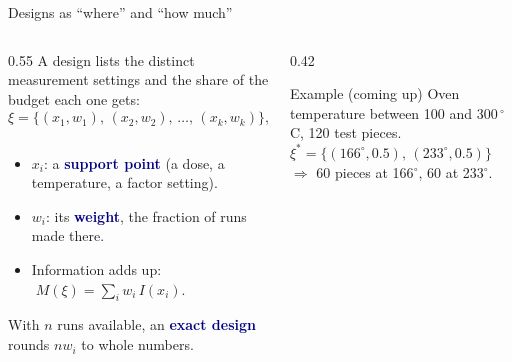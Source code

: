 \documentclass[aspectratio=169,10pt]{beamer}
\newcommand{\key}[1]{\textcolor{navy}{\textbf{#1}}}
\begin{document}
\begin{frame}{Designs as ``where'' and ``how much''}
  \begin{columns}[T]
    \begin{column}{0.55\textwidth}
      A design lists the distinct measurement settings and the share of the budget each one gets:
      \[
        \xi = \{(x_1,w_1),\,(x_2,w_2),\,\ldots,\,(x_k,w_k)\},\qquad \sum_i w_i = 1 .
      \]
      \begin{itemize}
        \item $x_i$: a \key{support point} (a dose, a temperature, a factor setting).
        \item $w_i$: its \key{weight}, the fraction of runs made there.
        \item Information adds up: $\;M(\xi)=\sum_i w_i\, I(x_i)$.
      \end{itemize}
      \vspace{0.4em}
      With $n$ runs available, an \key{exact design} rounds $n w_i$ to whole numbers.
    \end{column}
    \begin{column}{0.42\textwidth}
      \begin{exampleblock}{Example (coming up)}
        Oven temperature between 100 and 300\,$^\circ$C, 120 test pieces.\\[3pt]
        $\xi^* = \{(166^\circ, 0.5),\,(233^\circ, 0.5)\}$\\[3pt]
        $\Rightarrow$ 60 pieces at 166$^\circ$, 60 at 233$^\circ$.
      \end{exampleblock}
    \end{column}
  \end{columns}
\end{frame}
\end{document}
